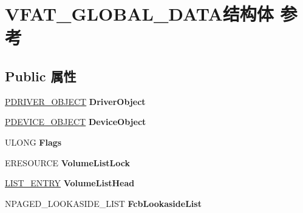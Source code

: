 \hypertarget{struct_v_f_a_t___g_l_o_b_a_l___d_a_t_a}{}\section{V\+F\+A\+T\+\_\+\+G\+L\+O\+B\+A\+L\+\_\+\+D\+A\+T\+A结构体 参考}
\label{struct_v_f_a_t___g_l_o_b_a_l___d_a_t_a}
\subsection*{Public 属性}
\begin{DoxyCompactItemize}
\item 
\mbox{\label{struct_v_f_a_t___g_l_o_b_a_l___d_a_t_a_a25b59cd71336c814155b19c99f1cb09a}} 
\hyperlink{struct___d_r_i_v_e_r___o_b_j_e_c_t}{P\+D\+R\+I\+V\+E\+R\+\_\+\+O\+B\+J\+E\+CT} {\bfseries Driver\+Object}
\item 
\mbox{\label{struct_v_f_a_t___g_l_o_b_a_l___d_a_t_a_af2aa658a0e1a6f7d964ca523112026da}} 
\hyperlink{struct___d_e_v_i_c_e___o_b_j_e_c_t}{P\+D\+E\+V\+I\+C\+E\+\_\+\+O\+B\+J\+E\+CT} {\bfseries Device\+Object}
\item 
\mbox{\label{struct_v_f_a_t___g_l_o_b_a_l___d_a_t_a_a00c9352174df1282e6521861eb09f642}} 
U\+L\+O\+NG {\bfseries Flags}
\item 
\mbox{\label{struct_v_f_a_t___g_l_o_b_a_l___d_a_t_a_a3611ed0b87a8e53a432e62457fc06e91}} 
E\+R\+E\+S\+O\+U\+R\+CE {\bfseries Volume\+List\+Lock}
\item 
\mbox{\label{struct_v_f_a_t___g_l_o_b_a_l___d_a_t_a_af1f15b30db04245ef4f2a74ebced0323}} 
\hyperlink{struct___l_i_s_t___e_n_t_r_y}{L\+I\+S\+T\+\_\+\+E\+N\+T\+RY} {\bfseries Volume\+List\+Head}
\item 
\mbox{\label{struct_v_f_a_t___g_l_o_b_a_l___d_a_t_a_a617c798cc3bcfc47c89fbb0a0026dcda}} 
N\+P\+A\+G\+E\+D\+\_\+\+L\+O\+O\+K\+A\+S\+I\+D\+E\+\_\+\+L\+I\+ST {\bfseries Fcb\+Lookaside\+List}
\item 
\mbox{\label{struct_v_f_a_t___g_l_o_b_a_l___d_a_t_a_a09e6b9cd102d28d847a15a2b6324c645}} 

\end{DoxyCompactItemize}
